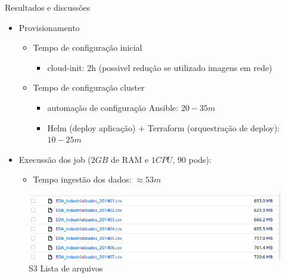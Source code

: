 \documentclass[10pt,brazil]{beamer}
\theoremstyle{definition}
\begin{document}
\begin{frame}{Resultados e discussões}
  \begin{itemize}
    \item Provisionamento
    \begin{itemize}
      \item Tempo de configuração inicial
      \begin{itemize}
        \item cloud-init: 2h (possivel redução  se utilizado imagens em rede)
      \end{itemize}
    \end{itemize}
    \begin{itemize}
      \item Tempo de configuração cluster
        \begin{itemize}
          \item automação de configuração Ansible: $20-35m$
          \item Helm (deploy aplicação) + Terraform (orquestração de deploy): $10-25m$
        \end{itemize}
    \end{itemize}
    \item Execussão dos job ($2GB$ de RAM e $1CPU$, $90$ pods):
    \begin{itemize}
        \item Tempo ingestão dos dados: $\approx 53m$ 
    \end{itemize}
  \end{itemize}
\end{frame}


\begin{frame}[plain]
  \hspace*{-10mm}
  \begin{figure}
    \centering  
  \includegraphics[width=.75\paperwidth]{s3_size.png}
      \caption{S3 Lista de arquivos}
  \end{figure}  
\end{frame}
\end{document}
